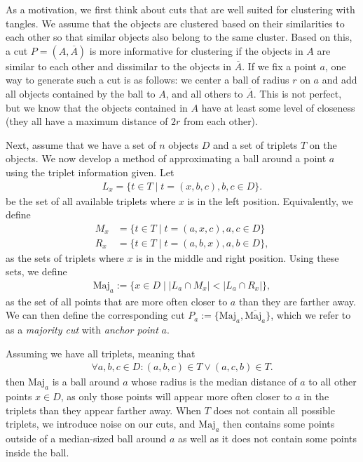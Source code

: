 As a motivation, we first think about cuts that are well suited for clustering with tangles.
We assume that the objects are clustered based on their similarities to each other so that 
similar objects also belong to the same cluster. Based on this, a cut $P = \left(   A, \overline{A} \right) $ is more informative for clustering if the objects in $A$ are similar to each other and
dissimilar to the objects in $\overline{A}$. If we fix a point $a$, one way
to generate such a cut is as follows: 
we center a ball of radius $r$ on $a$ and add all objects contained by the ball to $A$, 
and all others to $\overline{A}$. This is not perfect, but we know that the objects
contained in $A$ have at least some level of closeness (they all have 
a maximum distance of $2r$ from each other). 

Next, assume that we have a set of $n$ objects $D$ and a set of triplets $T$ on the
objects. We now develop a method of approximating a ball around a point $a$ using the
triplet information given. Let 
\begin{align*}
L_x = \{t \in T  \mid  t = (x, b,c), b,c \in D\} 
.\end{align*}
be the set of all available triplets where $x$ is in the left position. Equivalently, 
we define 
\begin{align*}
    M_x &=  \{t \in T  \mid  t = (a, x, c), a,c \in D\} \\
    R_x &=  \{t \in T  \mid  t = (a, b, x), a,b \in D\} 
,\end{align*}
as the sets of triplets where $x$ is in the middle and right position. 
Using these sets, we define  
\begin{align*}
    \text{Maj} _a := \{x \in D \mid \left| L_a \cap M_x\right| < \left| L_a \cap R_x \right| \}
,\end{align*}
as the set of all points that are more often closer to $a$ than they are farther away. 
We can then define the corresponding cut $P_a := \{ \text{Maj}_a, \overline{\text{Maj}_a } \}$, which
we refer to as a \textit{majority cut} with \textit{anchor point} $a$.

Assuming we have all triplets, meaning that 
\begin{align*}
    \forall a,b,c \in D: (a,b,c) \in T \vee (a,c,b) \in T
.\end{align*}
then $\text{Maj}_a$ is a ball around $a$ whose radius is the median distance of $a$ to all other points $x \in D$, as only those points will appear more often closer to $a$ in the triplets
than they appear farther away. When $T$ does not contain all possible triplets, we introduce 
noise on our cuts, and $\text{Maj}_a$ then contains some points outside of a median-sized ball
around $a$ as well as it does not contain some points inside the ball.

